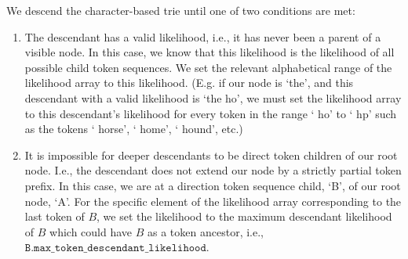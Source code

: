 We descend the character-based trie until one of two conditions are met:
\begin{enumerate}
    \item The descendant has a valid likelihood, i.e., it has never been a parent of a visible node.
    In this case, we know that this likelihood is the likelihood of all possible child token sequences.
    We set the relevant alphabetical range of the likelihood array to this likelihood.
    (E.g. if our node is `the', and this descendant with a valid likelihood is `the ho', we must set
    the likelihood array to this descendant's likelihood for every token in the range ` ho' to ` hp' such as
    the tokens ` horse', ` home', ` hound', etc.)
    \item It is impossible for deeper descendants to be direct token children of our root node. I.e.,
    the descendant does not extend our node by a strictly partial token prefix.
    In this case, we are at a direction token sequence child, `B', of our root node, `A'.
    For the specific element of the likelihood array corresponding to the last token of $B$,
    we set the likelihood to the maximum descendant likelihood of $B$ which could have $B$ as a token ancestor,
    i.e., $\texttt{B.max\_token\_descendant\_likelihood}$.
\end{enumerate}
